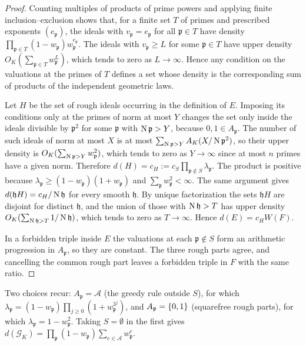 \begin{proof}
Counting multiples of products of prime powers and applying finite inclusion--exclusion
shows that, for a finite set $T$ of primes and prescribed exponents $(e_{\mathfrak p})$, the
ideals with $v_{\mathfrak p}=e_{\mathfrak p}$ for all $\mathfrak p\in T$ have density
$\prod_{\mathfrak p\in T}(1-w_{\mathfrak p})w_{\mathfrak p}^{e_{\mathfrak p}}$. The ideals with
$v_{\mathfrak p}\ge L$ for some $\mathfrak p\in T$ have upper density
$O_K(\sum_{\mathfrak p\in T}w_{\mathfrak p}^L)$, which tends to zero as $L\to\infty$. Hence
any condition on the valuations at the primes of $T$ defines a set whose density is the
corresponding sum of products of the independent geometric laws.

Let $H$ be the set of rough ideals occurring in the definition of $E$. Imposing its
conditions only at the primes of norm at most $Y$ changes the set only inside the ideals
divisible by $\mathfrak p^2$ for some $\mathfrak p$ with $\operatorname{N}\mathfrak p>Y$, because
$0,1\in A_{\mathfrak p}$. The number of such ideals of norm at most $X$ is at most
$\sum_{\operatorname{N}\mathfrak p>Y}A_K(X/\operatorname{N}\mathfrak p^2)$, so their upper density is
$O_K(\sum_{\operatorname{N}\mathfrak p>Y}w_{\mathfrak p}^2)$, which tends to zero as $Y\to\infty$ since at
most $n$ primes have a given norm. Therefore $d(H)=c_H:=c_S\prod_{\mathfrak p\notin S}
\lambda_{\mathfrak p}$. The product is positive because
$\lambda_{\mathfrak p}\ge(1-w_{\mathfrak p})(1+w_{\mathfrak p})$ and
$\sum_{\mathfrak p}w_{\mathfrak p}^2<\infty$. The same argument gives
$d(\mathfrak hH)=c_H/\operatorname{N}\mathfrak h$ for every smooth $\mathfrak h$. By unique factorization
the sets $\mathfrak hH$ are disjoint for distinct $\mathfrak h$, and the union of those with
$\operatorname{N}\mathfrak h>T$ has upper density $O_K(\sum_{\operatorname{N}\mathfrak h>T}1/\operatorname{N}\mathfrak h)$, which
tends to zero as $T\to\infty$. Hence $d(E)=c_HW(F)$.

In a forbidden triple inside $E$ the valuations at each $\mathfrak p\notin S$ form an
arithmetic progression in $A_{\mathfrak p}$, so they are constant. The three rough parts
agree, and cancelling the common rough part leaves a forbidden triple in $F$ with the same
ratio.
\end{proof}

Two choices recur: $A_{\mathfrak p}=\mathcal A$ (the greedy rule outside $S$), for which
$\lambda_{\mathfrak p}=(1-w_{\mathfrak p})\prod_{j\ge0}(1+w_{\mathfrak p}^{3^j})$, and
$A_{\mathfrak p}=\{0,1\}$ (squarefree rough parts), for which
$\lambda_{\mathfrak p}=1-w_{\mathfrak p}^2$. Taking $S=\emptyset$ in the first gives
$d(\mathcal G_K)=\prod_{\mathfrak p}(1-w_{\mathfrak p})\sum_{e\in\mathcal A}w_{\mathfrak p}^e$.

